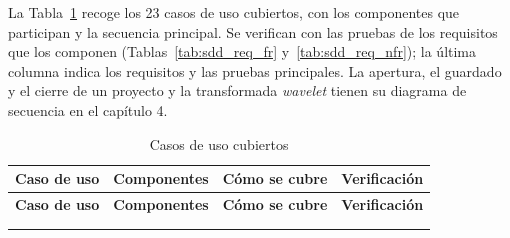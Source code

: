 \documentclass[12pt,letterpaper,oneside]{article}
\DeclareRobustCommand{\_}{\textunderscore\allowbreak}
\begin{document}
La Tabla~\ref{tab:sdd_cu} recoge los 23 casos de uso cubiertos, con los componentes que participan y la secuencia principal. Se verifican con las pruebas de los requisitos que los componen (Tablas~\ref{tab:sdd_req_fr} y~\ref{tab:sdd_req_nfr}); la última columna indica los requisitos y las pruebas principales. La apertura, el guardado y el cierre de un proyecto y la transformada \textit{wavelet} tienen su diagrama de secuencia en el capítulo 4.

\begin{center}
\footnotesize
\setlength{\tabcolsep}{3pt}
\begin{longtable}{|>{\raggedright\arraybackslash}p{2.7cm}|>{\raggedright\arraybackslash}p{3.2cm}|>{\raggedright\arraybackslash}p{5.6cm}|>{\raggedright\arraybackslash}p{3.1cm}|}
\hline
\textbf{Caso de uso} & \textbf{Componentes} & \textbf{Cómo se cubre} & \textbf{Verificación} \\
\hline
\endfirsthead
\hline
\textbf{Caso de uso} & \textbf{Componentes} & \textbf{Cómo se cubre} & \textbf{Verificación} \\
\hline
\endhead
\hline
\endfoot
\caption{Casos de uso cubiertos} \label{tab:sdd_cu} \\
\endlastfoot


\end{longtable}
\end{center}
\end{document}

